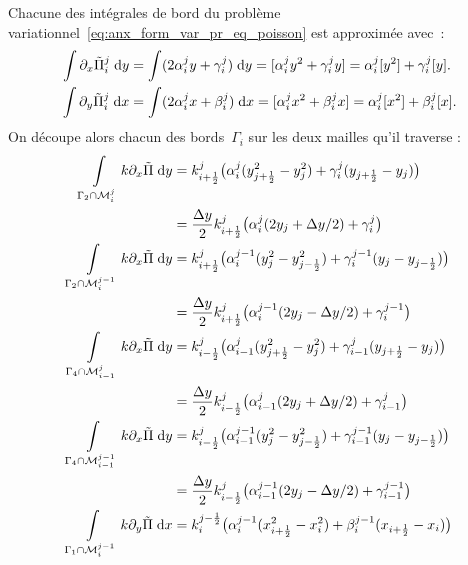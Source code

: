 \documentclass[main.tex]{subfiles}
\begin{document}
Chacune des intégrales de bord du problème variationnel~\ref{eq:anx_form_var_pr_eq_poisson} est approximée avec~:
\begin{align*}
\int \partial_x \tilde{\Pi}_i^j \;{\rm d}y &= \int (2\alpha_i^jy + \gamma_i^j) \;{\rm d}y = [\alpha_i^jy^2 + \gamma_i^j y ] = \alpha_i^j [y^2] + \gamma_i^j [y]. \\
\int \partial_y \tilde{\Pi}_i^j \;{\rm d}x &= \int (2\alpha_i^jx + \beta_i^j) \;{\rm d}x = [\alpha_i^jx^2 + \beta_i^j x ] = \alpha_i^j [x^2] + \beta_i^j [x ].
\end{align*}
On découpe alors chacun des bords~$\Gamma_i$ sur les deux mailles qu'il traverse :
\begin{align}
\int\limits_{\Gamma_2 \cap \mathcal{M}_i^j} k \partial_x \tilde{\Pi} \dy & =  k_{i+\frac{1}{2}}^j \big( \alpha_i^j ( y^2_{j+\frac{1}{2}} - y^2_j) + \gamma_i^j ( y_{j+\frac{1}{2}} - y_j)\big) \nonumber\\
& = \frac{\Delta y}{2}  k_{i+\frac{1}{2}}^j \big( \alpha_i^j ( 2y_j + \Delta y/2 ) + \gamma_i^j \big) 
\\
\int\limits_{\Gamma_2 \cap \mathcal{M}_i^{j-1}} k \partial_x \tilde{\Pi} \dy  & =  k_{i+\frac{1}{2}}^j \big( \alpha_i^{j-1} (  y^2_j -  y^2_{j-\frac{1}{2}} ) + \gamma_i^{j-1} ( y_j - y_{j-\frac{1}{2}})\big) \nonumber \\  
& = \frac{\Delta y}{2} k_{i+\frac{1}{2}}^j \big( \alpha_i^{j-1} (  2y_j -  \Delta y / 2 ) + \gamma_i^{j-1} \big)
\\
\int\limits_{\Gamma_4 \cap \mathcal{M}_{i-1}^j} k \partial_x \tilde{\Pi} \dy  & =  k_{i-\frac{1}{2}}^j \big( \alpha_{i-1}^j ( y^2_{j+\frac{1}{2}} - y^2_j) + \gamma_{i-1}^j ( y_{j+\frac{1}{2}} - y_j)\big)  \nonumber \\
 & = \frac{\Delta y}{2} k_{i-\frac{1}{2}}^j \big( \alpha_{i-1}^j ( 2 y_j + \Delta y/2) + \gamma_{i-1}^j \big) 
\\
\int\limits_{\Gamma_4 \cap \mathcal{M}_{i-1}^{j-1}} k \partial_x \tilde{\Pi} \dy & =  k_{i-\frac{1}{2}}^j \big( \alpha_{i-1}^{j-1} (  y^2_j -  y^2_{j-\frac{1}{2}} ) + \gamma_{i-1}^{j-1} ( y_j - y_{j-\frac{1}{2}})\big)  \nonumber \\
& = \frac{\Delta y}{2}  k_{i-\frac{1}{2}}^j \big( \alpha_{i-1}^{j-1} (  2 y_j - \Delta y /2 ) + \gamma_{i-1}^{j-1} \big) 
\\
\int\limits_{\Gamma_1 \cap \mathcal{M}_i^{j-1}} k \partial_y \tilde{\Pi} \dx  & =  k_i^{j-\frac{1}{2}} \big( \alpha_i^{j-1} ( x^2_{i+\frac{1}{2}} - x^2_i) + \beta_i^{j-1} ( x_{i+\frac{1}{2}} - x_i)\big)  \nonumber \\

\end{align}
\end{document}
